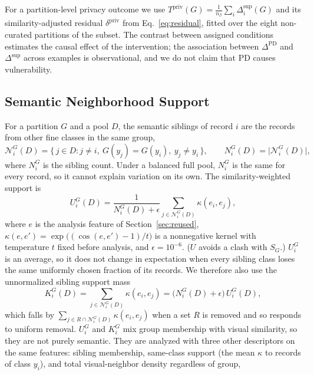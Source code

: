 \documentclass{article} %
\begin{document}
For a partition-level privacy outcome we use $T^{\mathrm{priv}}(G)=\frac{1}{n_\beta}\sum_{i}\Delta_i^{\mathrm{sup}}(G)$ and its similarity-adjusted residual $\delta^{\mathrm{priv}}$ from Eq.~\ref{eq:residual}, fitted over the eight non-curated partitions of the subset. The contrast between assigned conditions estimates the causal effect of the intervention; the association between $\Delta^{\mathrm{PD}}$ and $\Delta^{\mathrm{sup}}$ across examples is observational, and we do not claim that PD causes vulnerability.

\subsection{Semantic Neighborhood Support}
\label{sec:support}

For a partition $G$ and a pool $D$, the semantic siblings of record $i$ are the records from other fine classes in the same group,
\begin{equation}
\mathcal{N}_i^{G}(D)=\{\,j\in D: j\neq i,\ G(y_j)=G(y_i),\ y_j\neq y_i\,\},\qquad N_i^{G}(D)=\big|\mathcal{N}_i^{G}(D)\big|,
\label{eq:siblings}
\end{equation}
where $N_i^G$ is the sibling count.
Under a balanced full pool, $N_i^G$ is the same for every record, so it cannot explain variation on its own. The similarity-weighted support is
\begin{equation}
U_i^{G}(D)=\frac{1}{N_i^{G}(D)+\epsilon}\sum_{j\in\mathcal{N}_i^{G}(D)}\kappa(e_i,e_j),
\label{eq:support}
\end{equation}
where $e$ is the analysis feature of Section~\ref{sec:reused}, $\kappa(e,e')=\exp\big((\cos(e,e')-1)/t\big)$ is a nonnegative kernel with temperature $t$ fixed before analysis, and $\epsilon=10^{-6}$. ($U$ avoids a clash with $S_G$.) $U_i^G$ is an average, so it does not change in expectation when every sibling class loses the same uniformly chosen fraction of its records. We therefore also use the unnormalized sibling support mass
\begin{equation}
K_i^{G}(D)=\sum_{j\in\mathcal{N}_i^{G}(D)}\kappa(e_i,e_j)=\big(N_i^{G}(D)+\epsilon\big)\,U_i^{G}(D),
\label{eq:mass}
\end{equation}
which falls by $\sum_{j\in R\cap\mathcal{N}_i^G(D)}\kappa(e_i,e_j)$ when a set $R$ is removed and so responds to uniform removal. $U_i^G$ and $K_i^G$ mix group membership with visual similarity, so they are not purely semantic. They are analyzed with three other descriptors on the same features: sibling membership, same-class support (the mean $\kappa$ to records of class $y_i$), and total visual-neighbor density regardless of group,
\end{document}
